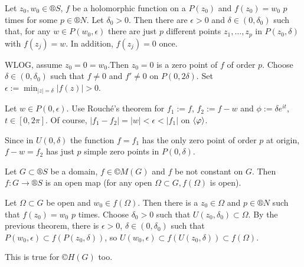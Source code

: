 \documentclass[12pt]{article}					%
\begin{document}
\begin{veta}
	Let $z_0, w_0 \in ®S$, $f$ be a holomorphic function on a $P(z_0)$ and $f(z_0) = w_0$ $p$ times for some $p \in ®N$. Let $\delta_0 > 0$. Then there are $\epsilon > 0$ and $\delta \in (0, \delta_0)$ such that, for any $w \in P(w_0, \epsilon)$ there are just $p$ different points $z_1, …, z_p$ in $P(z_0, \delta)$ with $f(z_j) = w$. In addition, $f(z_j) = 0$ once.

	\begin{dukazin}
		WLOG, assume $z_0 = 0 = w_0$.Then $z_0 = 0$ is a zero point of $f$ of order $p$. Choose $\delta \in (0, \delta_0)$ such that $f ≠ 0$ and $f' ≠ 0$ on $P(0, 2\delta)$. Set $\epsilon := \min_{|z| = \delta} |f(z)| > 0$.

		Let $w \in P(0, \epsilon)$. Use Rouché's theorem for $f_1 := f$, $f_2 := f - w$ and $\phi := \delta e^{it}$, $t \in [0, 2\pi]$. Of course, $|f_1 - f_2| = |w| < \epsilon < |f_1|$ on $\left\langle\varphi\right\rangle$.

		Since in $U(0, \delta)$ the function $f = f_1$ has the only zero point of order $p$ at origin, $f - w = f_2$ has just $p$ simple zero points in $P(0, \delta)$.
	\end{dukazin}
\end{veta}

\begin{dusledek}
	Let $G \subset ®S$ be a domain, $f \in ©M(G)$ and $f$ be not constant on $G$. Then $f: G \rightarrow ®S$ is an open map (for any open $\Omega \subset G, f(\Omega)$ is open).

	\begin{dukazin}
		Let $\Omega \subset G$ be open and $w_0 \in f(\Omega)$. Then there is a $z_0 \in \Omega$ and $p \in ®N$ such that $f(z_0) = w_0$ $p$ times. Choose $\delta_0 > 0$ such that $U(z_0, \delta_0) \subset \Omega$. By the previous theorem, there is $\epsilon > 0$, $\delta \in (0, \delta_0)$ such that $P(w_0, \epsilon) \subset f(P(z_0, \delta))$, so $U(w_0, \epsilon) \subset f(U(z_0, \delta)) \subset f(\Omega)$.
	\end{dukazin}

	\begin{poznamkain}
		This is true for $©H(G)$ too.
	\end{poznamkain}
\end{dusledek}
\end{document}
